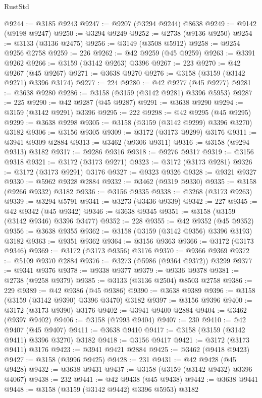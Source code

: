 \begin{lexlean}{RustStd}
\begin{coremodule}
@9244 := @3185 @9243
@9247 := @9207 (@3294 @9244) @8638
@9249 := @9142 (@9198 @9247)
@9250 := @3294 @9249
@9252 := @2738 (@9136 @9250)
@9254 := @3133 (@3136 @2475)
@9256 := @3149 (@3508 @5912)
@9258 := @9254 @9256 @2758
@9259 := 226
@9262 := @42 @9259 (@45 @9259)
@9263 := @3391 @9262
@9266 := @3159 (@3142 @9263) @3396
@9267 := 223
@9270 := @42 @9267 (@45 @9267)
@9271 := @3638 @9270
@9276 := @3158 (@3159 (@3142 @9271) @3396 @3174)
@9277 := 224
@9280 := @42 @9277 (@45 @9277)
@9281 := @3638 @9280
@9286 := @3158 (@3159 (@3142 @9281) @3396 @5953)
@9287 := 225
@9290 := @42 @9287 (@45 @9287)
@9291 := @3638 @9290
@9294 := @3159 (@3142 @9291) @3396
@9295 := 222
@9298 := @42 @9295 (@45 @9295)
@9299 := @3638 @9298
@9305 := @3158 (@3159 (@3142 @9299) @3396 @3270) @3182
@9306 := @3156 @9305
@9309 := @3172 (@3173 @9299) @3176
@9311 := @3941 @9309 @2884
@9313 := @3462 (@9306 @9311)
@9316 := @3158 (@9294 @9313) @3182
@9317 := @9286 @9316
@9318 := @9276 @9317
@9319 := @3156 @9318
@9321 := @3172 (@3173 @9271)
@9323 := @3172 (@3173 @9281)
@9326 := @3172 (@3173 @9291) @3176
@9327 := @9323 @9326
@9328 := @9321 @9327
@9330 := @5962 @9328 @2884
@9332 := @3462 (@9319 @9330)
@9335 := @3158 (@9266 @9332) @3182
@9336 := @3156 @9335
@9338 := @3268 (@3173 @9263)
@9339 := @3294 @5791
@9341 := @3273 (@3436 @9339)
@9342 := 227
@9345 := @42 @9342 (@45 @9342)
@9346 := @3638 @9345
@9351 := @3158 (@3159 (@3142 @9346) @3396 @3477)
@9352 := 228
@9355 := @42 @9352 (@45 @9352)
@9356 := @3638 @9355
@9362 := @3158 (@3159 (@3142 @9356) @3396 @3193) @3182
@9363 := @9351 @9362
@9364 := @3156 @9363
@9366 := @3172 (@3173 @9346)
@9369 := @3172 (@3173 @9356) @3176
@9370 := @9366 @9369
@9372 := @5109 @9370 @2884
@9376 := @3273 (@5986 (@9364 @9372)) @3299
@9377 := @9341 @9376
@9378 := @9338 @9377
@9379 := @9336 @9378
@9381 := @2738 (@9258 @9379)
@9385 := @3133 (@3136 @2504) @8503 @2758
@9386 := 229
@9389 := @42 @9386 (@45 @9386)
@9390 := @3638 @9389
@9396 := @3158 (@3159 (@3142 @9390) @3396 @3470) @3182
@9397 := @3156 @9396
@9400 := @3172 (@3173 @9390) @3176
@9402 := @3941 @9400 @2884
@9404 := @3462 (@9397 @9402)
@9406 := @3158 (@7993 @9404)
@9407 := 230
@9410 := @42 @9407 (@45 @9407)
@9411 := @3638 @9410
@9417 := @3158 (@3159 (@3142 @9411) @3396 @3270) @3182
@9418 := @3156 @9417
@9421 := @3172 (@3173 @9411) @3176
@9423 := @3941 @9421 @2884
@9425 := @3462 (@9418 @9423)
@9427 := @3158 (@3996 @9425)
@9428 := 231
@9431 := @42 @9428 (@45 @9428)
@9432 := @3638 @9431
@9437 := @3158 (@3159 (@3142 @9432) @3396 @4067)
@9438 := 232
@9441 := @42 @9438 (@45 @9438)
@9442 := @3638 @9441
@9448 := @3158 (@3159 (@3142 @9442) @3396 @5953) @3182

\end{coremodule}
\end{lexlean}
